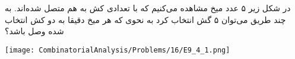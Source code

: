 \p
در شکل زیر ۵ عدد میخ مشاهده می‌کنیم که با تعدادی کش به هم متصل شده‌اند. به چند طریق می‌توان ۵ گش انتخاب کرد به نحوی که هر میخ دقیقا به دو کش انتخاب شده وصل باشد؟
\begin{center}
  \texttt{[image: CombinatorialAnalysis/Problems/16/E9\_4\_1.png]}
\end{center}